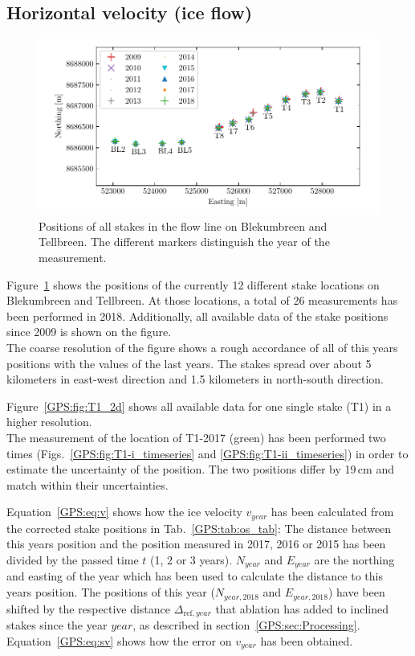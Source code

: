 \subsection{Horizontal velocity (ice flow)}

\begin{figure}[H]
    \centering
    \includegraphics[width=\textwidth]{./figs/stakePositions.pdf}
    \caption{Positions of all stakes in the flow line on Blekumbreen and Tellbreen.
    The different markers distinguish the year of the measurement.}
    \label{GPS:fig:stakepos}
\end{figure}

Figure~\ref{GPS:fig:stakepos} shows the positions of the currently 12 different stake locations
on Blekumbreen and Tellbreen.
At those locations, a total of 26 measurements has been performed in 2018.
Additionally, all available data of the stake positions since 2009 is shown on the figure.\\
The coarse resolution of the figure shows a rough accordance of all of this years positions with the values 
of the last years.
The stakes spread over about 5 kilometers in east-west direction and 1.5 kilometers in north-south direction.

Figure~\ref{GPS:fig:T1_2d} shows all available data for one single stake (T1) in a higher resolution.\\
The measurement of the location of T1-2017 (green) has been performed two times
(Figs.~\ref{GPS:fig:T1-i_timeseries} and \ref{GPS:fig:T1-ii_timeseries})
in order to estimate the uncertainty
of the position.
The two positions differ by 19\,cm and match within their uncertainties.

Equation~\ref{GPS:eq:v} shows how the ice velocity $v_{year}$ has been calculated from the corrected stake positions in
Tab.~\ref{GPS:tab:os_tab}:
The distance between this years position and the position measured in 2017, 2016 or 2015 has been divided
by the passed time $t$ (1, 2 or 3 years).
$N_{year}$ and $E_{year}$ are the northing and easting of the year which has been used to calculate the distance to
this years position.
The positions of this year ($N_{year, 2018}$ and $E_{year, 2018}$) have been shifted by the respective distance
$\Delta_{\text{ref}, year}$ that ablation has
added to inclined stakes since the year $year$, as described in section~\ref{GPS:sec:Processing}.
Equation~\ref{GPS:eq:sv} shows how the error on $v_{year}$ has been obtained.

